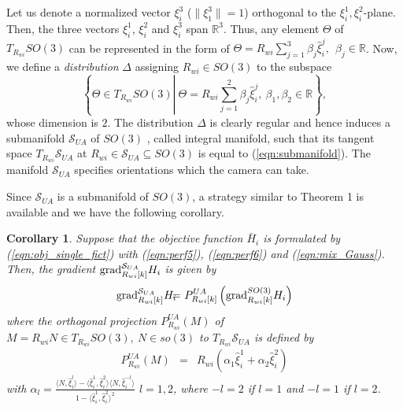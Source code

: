 \documentclass[conference,letterpaper]{ieeeconf}
\newtheorem{corollary}{Corollary}
\newcommand{\grad}{{\rm grad}}
\newcommand{\R}{{\mathbb R}}
\newcommand{\ewi}{R_{wi}}
\newcommand{\TSO}{T_{\ewi}SO(3)}
\begin{document}
Let us denote a normalized vector $\xi^3_i$ ($\|\xi_1^3\|=1$)
orthogonal to the $\xi^1_i, \xi^2_i$-plane.
Then, the three vectors $\xi^1_i$, $\xi^2_i$ and 
$\xi_i^3$ span $\R^3$.
Thus, any element $\Theta$ of $\TSO$ can be represented in the form of
$\Theta = \ewi \sum_{j=1}^3 \beta_j \hat{\xi}_i^j,\ \ \beta_j \in \R$.
Now, we define a {\it distribution} $\Delta$ \cite{MLS_BK} assigning
$\ewi \in SO(3)$ to the subspace 
\begin{equation}
\left\{\Theta\in \TSO\left|\ \Theta = \ewi \sum_{j=1}^2 \beta_j \hat{\xi}_i^j,\ \beta_1, \beta_2 \in \R
\right.
\right\},
\label{eqn:submanifold}
\end{equation}
whose dimension is $2$.
The distribution $\Delta$ is clearly regular and hence 
induces a submanifold ${\mathcal S}_{UA}$ of $SO(3)$ \cite{MLS_BK},
called integral manifold, such that its tangent space 
$T_{\ewi}{\mathcal S}_{UA}$ at $\ewi\in {\mathcal S}_{UA}
\subseteq SO(3)$ is equal to (\ref{eqn:submanifold}).
The manifold ${\mathcal S}_{UA}$ specifies 
orientations which the camera can take.



Since ${\mathcal S}_{UA}$ is a submanifold of $SO(3)$,
a strategy similar to Theorem 1 is available and
we have the following corollary.




\begin{corollary}
Suppose that the objective function $\bar H_i$ is formulated by (\ref{eqn:obj_single_fict})
with (\ref{eqn:perf5}), (\ref{eqn:perf6}) and (\ref{eqn:mix_Gauss}).
Then, the gradient $\grad_{\ewi[k]}^{{\mathcal S}_{UA}} H_i$ 
is given by 
\begin{eqnarray}
\grad_{\ewi[k]}^{{\mathcal S}_{UA}} H_i \!\!&\!\!=\!\!&\!\! 
P^{UA}_{\ewi[k]}\left(\grad_{\ewi[k]}^{SO(3)} H_i\right)
\label{eqn:proj3}
\end{eqnarray}
where the orthogonal projection $P^{UA}_{\ewi}(M)$ of
$M = \ewi N\in \TSO,\ N \in so(3)$ to $T_{\ewi}{\mathcal S}_{UA}$ is defined by
\begin{eqnarray}
P^{UA}_{\ewi}(M) \!\!&\!\!=\!\!&\!\! \ewi (
\alpha_1 \hat{\xi}_i^1 
+ \alpha_2 \hat{\xi}_i^2)
\label{eqn:proj4}
\end{eqnarray}
with $\alpha_l =
\frac{\langle N, \hat{\xi}_i^l\rangle - 
\langle \hat{\xi}_i^1, \hat{\xi}_i^2\rangle
\langle N, \hat{\xi}_i^{-l}\rangle}
{1 - \langle \hat{\xi}_i^1, \hat{\xi}_i^2\rangle^2}$
$l = 1, 2$, where $-l = 2$ if $l=1$ and
$-l = 1$ if $l=2$.
\end{corollary}
\end{document}
